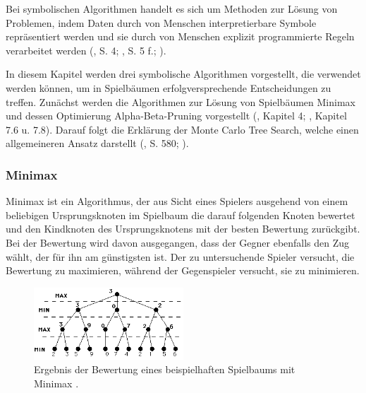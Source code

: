 \label{symbolische-algorithmen}

Bei symbolischen Algorithmen handelt es sich um Methoden zur Lösung von Problemen, indem Daten durch von Menschen interpretierbare Symbole repräsentiert werden und sie durch von Menschen explizit programmierte Regeln verarbeitet werden (\cite{Fergus.2022}, S. 4; \cite{Früh.2022}, S. 5 f.; \cite{Garnelo.2019}).

In diesem Kapitel werden drei symbolische Algorithmen vorgestellt, die verwendet werden können, um in Spielbäumen erfolgversprechende Entscheidungen zu treffen. Zunächst werden die Algorithmen zur Lösung von Spielbäumen Minimax und dessen Optimierung Alpha-Beta-Pruning vorgestellt (\cite{Ferguson.January2019}, Kapitel 4; \cite{Heineman.October2008}, Kapitel 7.6 u. 7.8). Darauf folgt die Erklärung der Monte Carlo Tree Search, welche einen allgemeineren Ansatz darstellt (\cite{Russell.2020}, S. 580; \cite{Swiechowski.2021}).

\subsubsection{Minimax}

Minimax ist ein Algorithmus, der aus Sicht eines Spielers ausgehend von einem beliebigen Ursprungsknoten im Spielbaum die darauf folgenden Knoten bewertet und den Kindknoten des Ursprungsknotens mit der besten Bewertung zurückgibt. Bei der Bewertung wird davon ausgegangen, dass der Gegner ebenfalls den Zug wählt, der für ihn am günstigsten ist. Der zu untersuchende Spieler versucht, die Bewertung zu maximieren, während der Gegenspieler versucht, sie zu minimieren.


\begin{figure}[ht!]%
	\includegraphics[width=0.5\textwidth, center]{Bilder/minimax.png}
	\caption[Ergebnis der Bewertung eines beispielhaften Spielbaums mit Minimax.]{Ergebnis der Bewertung eines beispielhaften Spielbaums mit Minimax \cite{Morelli_Minimax}.}
	\label{fig:f28}
\end{figure}

